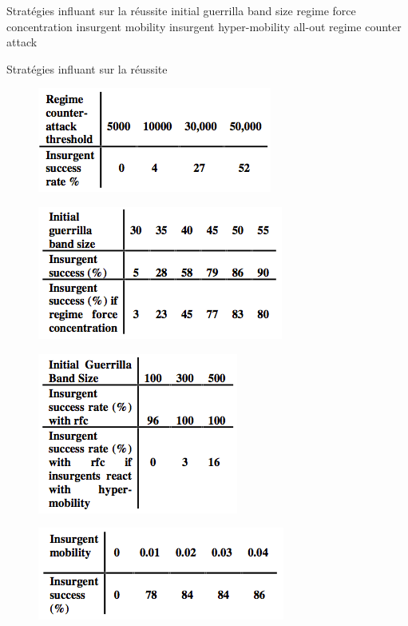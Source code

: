 \documentclass{article}
\begin{document}
Stratégies influant sur la réussite
initial guerrilla band size
regime force concentration
insurgent mobility
insurgent hyper-mobility
all-out regime counter attack

Stratégies influant sur la réussite
\begin{figure}[H]
	\begin{centering}
	\includegraphics[scale=0.9]{../ressources/iruba_counter_attack}
	\caption{}
	\end{centering}
\end{figure}
\begin{figure}[H]
	\begin{centering}
	\includegraphics[scale=0.9]{../ressources/iruba_force_concentration}
	\caption{}
	\end{centering}
\end{figure}
\begin{figure}[H]
	\begin{centering}
	\includegraphics[scale=0.9]{../ressources/iruba_hyper_mobility}
	\caption{}
	\end{centering}
\end{figure}
\begin{figure}[H]
	\begin{centering}
	\includegraphics[scale=0.9]{../ressources/iruba_mobility}
	\caption{}
	\end{centering}
\end{figure}
\end{document}
